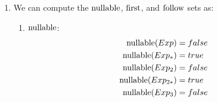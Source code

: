 \begin{exercise}{}
  \begin{solution}
    \begin{enumerate}
      \item We can compute the \(\operatorname{nullable}\), \(\operatorname{first}\), and \(\operatorname{follow}\) sets as:

        \begin{enumerate}
          \item \(\operatorname{nullable}\): 
            \begin{align*}
              \operatorname{nullable}(Exp) &= false \\
              \operatorname{nullable}(Exp_*) &= true \\
              \operatorname{nullable}(Exp_2) &= false \\
              \operatorname{nullable}(Exp_{2*}) &= true \\
              \operatorname{nullable}(Exp_3) &= false
            \end{align*}


\end{enumerate}
\end{enumerate}
\end{solution}
\end{exercise}
